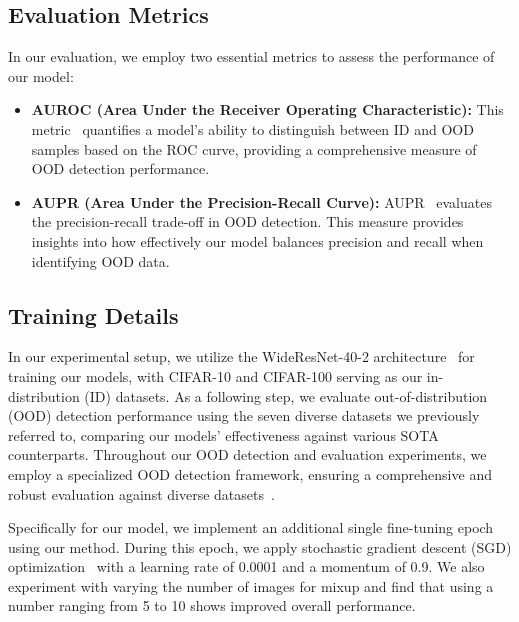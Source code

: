 \documentclass[letterpaper]{article} %
\begin{document}
\subsection{Evaluation Metrics}
\vspace{-0.13cm}
In our evaluation, we employ two essential metrics to assess the performance of our model:
\vspace{-0.1cm}
\begin{itemize}
    \item \textbf{AUROC (Area Under the Receiver Operating Characteristic):} This metric~\cite{AUROC} quantifies a model's ability to distinguish between ID and OOD samples based on the ROC curve, providing a comprehensive measure of OOD detection performance.
    \item \textbf{AUPR (Area Under the Precision-Recall Curve):} AUPR~\cite{AUPR} evaluates the precision-recall trade-off in OOD detection. This measure provides insights into how effectively our model balances precision and recall when identifying OOD data.
\end{itemize}
\vspace{-0.1cm}
\subsection{Training Details}
\vspace{-0.1cm}
In our experimental setup, we utilize the WideResNet-40-2 architecture~\cite{WideResnet} for training our models, with CIFAR-10 and CIFAR-100 serving as our in-distribution (ID) datasets. As a following step, we evaluate out-of-distribution (OOD) detection performance using the seven diverse datasets we previously referred to, comparing our models' effectiveness against various SOTA counterparts. Throughout our OOD detection and evaluation experiments, we employ a specialized OOD detection framework, ensuring a comprehensive and robust evaluation against diverse datasets~\cite{kirchheim2022pytorch}. 

Specifically for our model, we implement an additional single fine-tuning epoch using our method. During this epoch, we apply stochastic gradient descent (SGD) optimization~\cite{SGD} with a learning rate of 0.0001 and a momentum of 0.9. We also experiment with varying the number of images for mixup and find that using a number ranging from 5 to 10 shows improved overall performance.
\end{document}
